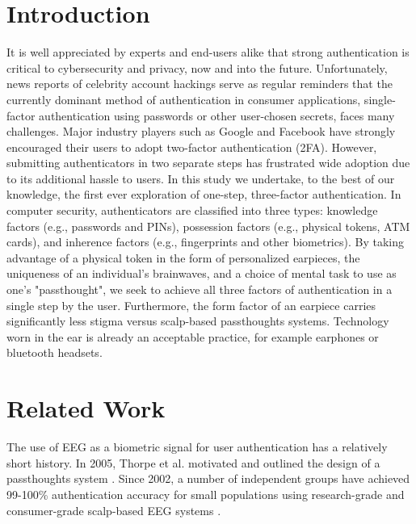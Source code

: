 \documentclass{sigchi-ext}
\begin{document}
\section{Introduction}
It is well appreciated by experts and end-users alike that strong authentication is
critical to cybersecurity and privacy, now and into the future. Unfortunately,
news reports of celebrity account hackings serve as regular reminders that
the currently dominant method of authentication in consumer applications, 
single-factor authentication using passwords or other user-chosen secrets, 
faces many challenges. Major industry players such as Google and
Facebook have strongly encouraged their users to adopt two-factor
authentication (2FA). However, submitting authenticators in two separate steps
 has frustrated wide adoption due to its additional hassle to users. In this study we undertake, to the best of our knowledge, the first ever exploration of one-step, three-factor authentication. In computer security,
authenticators are classified into three types: knowledge factors (e.g., passwords
and PINs), possession factors (e.g., physical tokens, ATM cards), and inherence
factors (e.g., fingerprints and other biometrics). By taking advantage of a physical token 
in the form of personalized earpieces, the uniqueness of an individual's brainwaves, and
a choice of mental task to use as one's "passthought", we seek to achieve all three factors 
of authentication in a single step by the user. Furthermore, the form factor of an earpiece carries significantly less stigma versus scalp-based passthoughts systems. Technology worn in the ear is already an acceptable practice, for example earphones or bluetooth headsets.


\section{Related Work}
The use of EEG as a biometric signal for user authentication has a relatively short history.
In 2005, Thorpe et al. motivated and outlined the design of a passthoughts system \cite{Thorpe2005}.
Since 2002, a number of independent groups have achieved 99-100\% authentication accuracy for small populations using research-grade and consumer-grade scalp-based EEG systems \cite{Poulos2002,Marcel2007a,Ashby2011,Chuang2013b}.
\end{document}
